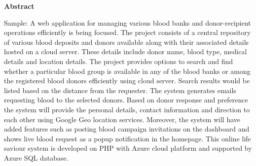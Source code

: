 \newpage
\thispagestyle{empty}
\begin{center}
  \vspace*{1cm}
  \textbf{\large Abstract}
\end{center}
Sample: A web application for managing various blood banks and donor-recipient operations efficiently is being focused. The project consists of a central repository of various blood deposits and donors available along with their associated details hosted on a cloud server. These details include donor name, blood type, medical details and location details. The project provides options to search and find whether a particular blood group is available in any of the blood banks or among the registered blood donors
efficiently using cloud server. Search results would be listed
based on the distance from the requester. The system generates emails requesting blood to the selected donors. Based on donor response and preference the system will provide the personal details, contact information and direction to each other using Google Geo location services. Moreover, the system will have added features such as posting blood campaign invitations on the dashboard and shows live blood request as a popup notification in the homepage. This online life saviour system is developed on PHP with Azure cloud platform and supported by Azure SQL database.




\tableofcontents
\printnomenclature
\listoffigures
\listoftables
\clearpage











